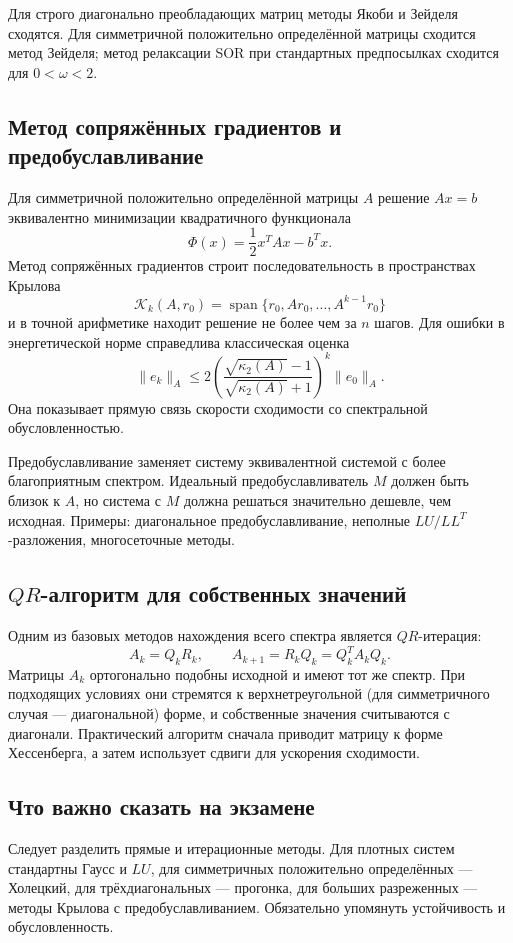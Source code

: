Для строго диагонально преобладающих матриц методы Якоби и Зейделя сходятся.
Для симметричной положительно определённой матрицы сходится метод Зейделя; метод
релаксации SOR при стандартных предпосылках сходится для $0<\omega<2$.

\subsection{Метод сопряжённых градиентов и предобуславливание}

Для симметричной положительно определённой матрицы $A$ решение $Ax=b$ эквивалентно
минимизации квадратичного функционала
\[
    \Phi(x)=\frac12 x^TAx-b^Tx.
\]
Метод сопряжённых градиентов строит последовательность в пространствах Крылова
\[
    \mathcal K_k(A,r_0)
    =\operatorname{span}\{r_0,Ar_0,\ldots,A^{k-1}r_0\}
\]
и в точной арифметике находит решение не более чем за $n$ шагов. Для ошибки в
энергетической норме справедлива классическая оценка
\[
    \|e_k\|_A
    \le
    2\left(
        \frac{\sqrt{\kappa_2(A)}-1}
             {\sqrt{\kappa_2(A)}+1}
      \right)^k
    \|e_0\|_A.
\]
Она показывает прямую связь скорости сходимости со спектральной обусловленностью.

Предобуславливание заменяет систему эквивалентной системой с более благоприятным
спектром. Идеальный предобуславливатель $M$ должен быть близок к $A$, но система с $M$
должна решаться значительно дешевле, чем исходная. Примеры: диагональное
предобуславливание, неполные $LU/LL^T$-разложения, многосеточные методы.

\subsection[QR-алгоритм для собственных значений]{$QR$-алгоритм для собственных значений}

Одним из базовых методов нахождения всего спектра является $QR$-итерация:
\[
    A_k=Q_kR_k,\qquad A_{k+1}=R_kQ_k=Q_k^TA_kQ_k.
\]
Матрицы $A_k$ ортогонально подобны исходной и имеют тот же спектр. При подходящих
условиях они стремятся к верхнетреугольной (для симметричного случая --- диагональной)
форме, и собственные значения считываются с диагонали. Практический алгоритм сначала
приводит матрицу к форме Хессенберга, а затем использует сдвиги для ускорения сходимости.

\subsection{Что важно сказать на экзамене}

Следует разделить прямые и итерационные методы. Для плотных систем стандартны
Гаусс и $LU$, для симметричных положительно определённых --- Холецкий, для
трёхдиагональных --- прогонка, для больших разреженных --- методы Крылова с
предобуславливанием. Обязательно упомянуть устойчивость и обусловленность.

\newpage
